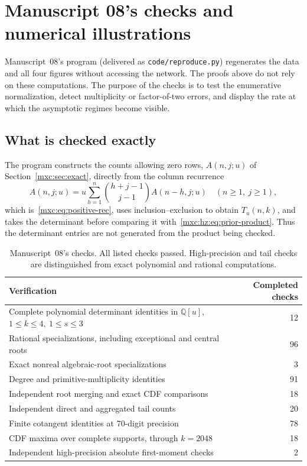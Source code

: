 \documentclass[11pt]{article}
\numberwithin{equation}{section}
\theoremstyle{definition}
\theoremstyle{remark}
\begin{document}
\section{Manuscript 08's checks and numerical illustrations}\label{mxc:hz:sec:computation}

Manuscript~08's program  (delivered as
\texttt{code/reproduce.py}) regenerates the data and all four figures
without accessing the network. The proofs above do not rely on these
computations. The purpose of the checks is to test the enumerative
normalization, detect multiplicity or factor-of-two errors, and display
the rate at which the asymptotic regimes become visible.

\subsection{What is checked exactly}

The program constructs the counts allowing zero rows, $A(n,j;u)$ of
Section~\ref{mxc:sec:exact}, directly from the column recurrence
\[
 A(n,j;u)=u\sum_{h=1}^n\binom{h+j-1}{j-1}A(n-h,j;u)
 \quad(n\ge1,\ j\ge1),
\]
which is~\eqref{mxc:eq:positive-rec}, uses inclusion--exclusion to obtain
$T_u(n,k)$, and takes the determinant before comparing it
with~\eqref{mxc:hz:eq:prior-product}. Thus the determinant entries are not
generated from the product being checked.

\begin{table}[htbp]
\centering\small
\begin{tabular}{@{}>{\raggedright\arraybackslash}p{}r@{}}
\toprule
Verification & Completed checks\\
\midrule
Complete polynomial determinant identities in $\mathbb Q[u]$,
 $1\le k\le4,\ 1\le s\le3$&12\\
Rational specializations, including exceptional and central roots&96\\
Exact nonreal algebraic-root specializations&3\\
Degree and primitive-multiplicity identities&91\\
Independent root merging and exact CDF comparisons&18\\
Independent direct and aggregated tail counts&20\\
Finite cotangent identities at 70-digit precision&78\\
CDF maxima over complete supports, through $k=2048$&18\\
Independent high-precision absolute first-moment checks&2\\
\bottomrule
\end{tabular}
\caption{Manuscript~08's checks. All listed checks passed. High-precision
and tail checks are distinguished from exact polynomial and rational
computations.}
\label{mxc:hz:tab:checks}
\end{table}
\end{document}
